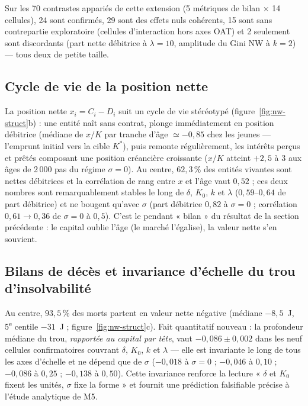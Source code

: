 \documentclass[11pt,a4paper]{article}
\newcommand{\NW}{\mathrm{NW}}
\begin{document}
Sur les 70 contrastes appariés de cette extension (5 métriques de
bilan $\times$ 14 cellules), 24 sont confirmés, 29 sont des effets nuls
cohérents, 15 sont sans contrepartie exploratoire (cellules
d'interaction hors axes OAT) et 2 seulement sont discordants (part
nette débitrice à $\lambda=10$, amplitude du Gini $\NW$ à $k=2$) —
tous deux de petite taille.

\subsection{Cycle de vie de la position nette}

La position nette $x_i=C_i-D_i$ suit un cycle de vie stéréotypé
(figure~\ref{fig:nw-struct}b) : une entité naît sans contrat, plonge
immédiatement en position débitrice (médiane de $x/K$ par tranche
d'âge $\simeq-0{,}85$ chez les jeunes — l'emprunt initial vers la
cible $K^\ast$), puis remonte régulièrement, les intérêts perçus et
prêtés composant une position créancière croissante ($x/K$ atteint
$+2{,}5$ à $3$ aux âges de 2\,000 pas du régime $\sigma=0$). Au centre,
$62{,}3\,\%$ des entités vivantes sont nettes débitrices et la
corrélation de rang entre $x$ et l'âge vaut $0{,}52$ ; ces deux nombres
sont remarquablement stables le long de $\delta$, $K_0$, $k$ et
$\lambda$ ($0{,}59$--$0{,}64$ de part débitrice) et ne bougent qu'avec
$\sigma$ (part débitrice $0{,}82$ à $\sigma=0$ ; corrélation $0{,}61\to
0{,}36$ de $\sigma=0$ à $0{,}5$). C'est le pendant « bilan » du
résultat de la section précédente : le capital oublie l'âge (le marché
l'égalise), la valeur nette s'en souvient.

\subsection{Bilans de décès et invariance d'échelle du trou
d'insolvabilité}

Au centre, $93{,}5\,\%$ des morts partent en valeur nette négative
(médiane $-8{,}5$~J, 5\textsuperscript{e} centile $-31$~J ;
figure~\ref{fig:nw-struct}c). Fait quantitatif nouveau : la profondeur
médiane du trou, \emph{rapportée au capital par tête}, vaut
$-0{,}086\pm0{,}002$ dans les neuf cellules confirmatoires couvrant
$\delta$, $K_0$, $k$ et $\lambda$ — elle est invariante le long de tous
les axes d'échelle et ne dépend que de $\sigma$ ($-0{,}018$ à
$\sigma=0$ ; $-0{,}046$ à $0{,}10$ ; $-0{,}086$ à $0{,}25$ ; $-0{,}138$
à $0{,}50$). Cette invariance renforce la lecture « $\delta$ et $K_0$
fixent les unités, $\sigma$ fixe la forme » et fournit une prédiction
falsifiable précise à l'étude analytique de M5.
\end{document}
